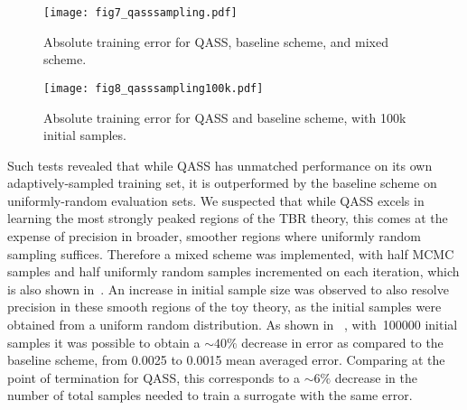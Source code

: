 \begin{figure}
	\centering
	\hspace*{-1.4em}\texttt{[image: fig7\_qasssampling.pdf]}
	\caption{\label{fig:qasssampling}Absolute training error for QASS, baseline scheme, and mixed scheme.}
\end{figure}

\begin{figure}
	\centering
	\hspace*{-1.4em}\texttt{[image: fig8\_qasssampling100k.pdf]}
	\caption{\label{fig:qasssampling100k}Absolute training error for QASS and baseline scheme, with 100k initial samples.}
\end{figure}

Such tests revealed that while QASS has unmatched performance on its own
adaptively-sampled training set, it is outperformed by the baseline scheme on
uniformly-random evaluation sets. We suspected that while QASS excels in
learning the most strongly peaked regions of the TBR theory, this comes at the
expense of precision in broader, smoother regions where uniformly random
sampling suffices. Therefore a mixed scheme was implemented, with half MCMC
samples and half uniformly random samples incremented on each iteration, which
is also shown in~. An increase in initial sample size was
observed to also resolve precision in these smooth regions of the toy theory, as
the initial samples were obtained from a uniform random distribution. As shown
in ~, with~\num{100000} initial samples it was
possible to obtain a ${\sim}40\%$ decrease in error as compared to the baseline
scheme, from 0.0025 to 0.0015 mean averaged error. Comparing at the point of
termination for QASS, this corresponds to a ${\sim}6\%$ decrease in the number
of total samples needed to train a surrogate with the same error. 


